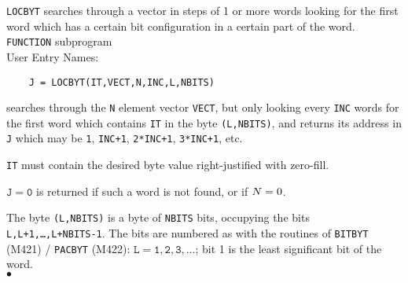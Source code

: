                         
                         
\Submitter{}                             
         
{\tt LOCBYT} searches through a vector in steps of 1 or more words
looking for the first word which has a certain bit configuration in a
certain part of the word.
\Structure
{\tt FUNCTION} subprogram \\
User Entry Names: 
\Usage
\begin{verbatim}
    J = LOCBYT(IT,VECT,N,INC,L,NBITS)
\end{verbatim}
searches through the {\tt N} element vector {\tt VECT}, but only
looking every {\tt INC} words for the first word which contains {\tt IT}
in the byte {\tt (L,NBITS)}, and returns its address in {\tt J} which
may be {\tt 1}, {\tt INC+1}, {\tt 2*INC+1}, {\tt 3*INC+1}, etc.
\par
{\tt IT} must contain the desired byte value right-justified with
zero-fill.
\par
$\mathtt{J=0}$ is returned if such a word is not found, or if ${\tt N=0}$.
\par
The byte {\tt (L,NBITS)} is a byte of {\tt NBITS} bits, occupying the
bits {\tt L,L+1,\ldots,L+NBITS-1}. The bits are numbered as with the
routines of {\tt BITBYT} (M421) / {\tt PACBYT} (M422):
$\mathtt{L = 1,2,3,\ldots}$; bit 1 is the least significant bit of the word.
\\ $\bullet$
